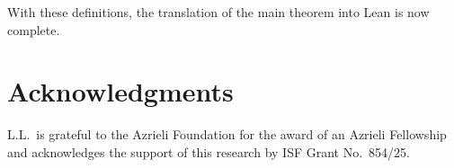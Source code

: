 \documentclass[reqno,a4paper,12pt]{amsart}
\begin{document}
With these definitions, the translation of the main theorem into Lean is now complete.

\section*{Acknowledgments}

L.L.~is grateful to the Azrieli Foundation for the award of an Azrieli Fellowship and acknowledges the support of this research by ISF Grant No.~854/25.



\end{document}
